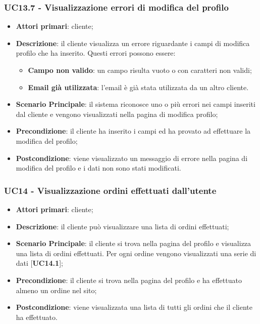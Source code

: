 \subsubsection{UC13.7 - Visualizzazione errori di modifica del profilo}
\begin{itemize}
\item \textbf{Attori primari}: cliente;
\item \textbf{Descrizione}: il cliente visualizza un errore riguardante i campi di modifica profilo che ha inserito. Questi errori possono essere:
\begin{itemize}
\item \textbf{Campo non valido}: un campo risulta vuoto o con caratteri non validi;
\item \textbf{Email già utilizzata}: l'email è già stata utilizzata da un altro cliente.
\end{itemize}
\item \textbf{Scenario Principale}: il sistema riconosce uno o più errori nei campi inseriti dal cliente e vengono visualizzati nella pagina di modifica profilo;
\item \textbf{Precondizione}: il cliente ha inserito i campi ed ha provato ad effettuare la modifica del profilo;
\item \textbf{Postcondizione}: viene visualizzato un messaggio di errore nella pagina di modifica del profilo e i dati non sono stati modificati.
\end{itemize}

\subsubsection{UC14 - Visualizzazione ordini effettuati dall'utente}
\begin{itemize}
\item \textbf{Attori primari}: cliente;
\item \textbf{Descrizione}: il cliente può visualizzare una lista di ordini effettuati;
\item \textbf{Scenario Principale}: il cliente si trova nella pagina del profilo e visualizza una lista di ordini effettuati. Per ogni ordine vengono visualizzati una serie di dati [\textbf{UC14.1}];
\item \textbf{Precondizione}: il cliente si trova nella pagina del profilo e ha effettuato almeno un ordine nel sito;
\item \textbf{Postcondizione}: viene visualizzata una lista di tutti gli ordini che il cliente ha effettuato.
\end{itemize}


